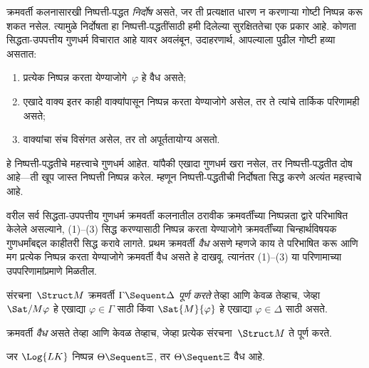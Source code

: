 \begin{explain}
क्रमवर्ती कलनासारखी निष्पत्ती-पद्धत \emph{निर्दोष} असते, जर ती
प्रत्यक्षात धारण न करणाऱ्या गोष्टी निष्पन्न करू शकत नसेल. त्यामुळे
निर्दोषता हा निष्पत्ती-पद्धतींसाठी हमी दिलेल्या सुरक्षिततेचा एक प्रकार
आहे. कोणता सिद्धता-उपपत्तीय गुणधर्म विचारात आहे यावर अवलंबून, उदाहरणार्थ,
आपल्याला पुढील गोष्टी हव्या असतात:
\begin{enumerate}
\item प्रत्येक निष्पन्न करता येण्याजोगे~$\varphi$ हे वैध असते;
\item एखादे वाक्य इतर काही वाक्यांपासून निष्पन्न करता येण्याजोगे असेल, तर ते
  त्यांचे तार्किक परिणामही असते;
\item वाक्यांचा संच विसंगत असेल, तर तो अपूर्ततायोग्य असतो.
\end{enumerate}
हे निष्पत्ती-पद्धतीचे महत्त्वाचे गुणधर्म आहेत. यांपैकी एखादा गुणधर्म
खरा नसेल, तर निष्पत्ती-पद्धतीत दोष आहे—ती खूप जास्त निष्पत्ती
निष्पन्न करेल. म्हणून निष्पत्ती-पद्धतीची निर्दोषता सिद्ध करणे अत्यंत
महत्त्वाचे आहे.

वरील सर्व सिद्धता-उपपत्तीय गुणधर्म क्रमवर्ती कलनातील ठरावीक क्रमवर्तींच्या
निष्पन्नता द्वारे परिभाषित केलेले असल्याने, (1)--(3) सिद्ध करण्यासाठी
निष्पन्न करता येण्याजोगे क्रमवर्तींच्या चिन्हार्थविषयक गुणधर्मांबद्दल काहीतरी सिद्ध करावे
लागते. प्रथम क्रमवर्ती \emph{वैध} असणे म्हणजे काय ते परिभाषित करू आणि मग
प्रत्येक निष्पन्न करता येण्याजोगे क्रमवर्ती वैध असते हे दाखवू. त्यानंतर (1)--(3) या
परिणामाच्या उपपरिणामांप्रमाणे मिळतील.
\end{explain}

\begin{defn}
संरचना~$\Struct
  M$ क्रमवर्ती
$\Gamma \Sequent \Delta$ \emph{पूर्ण करते} तेव्हा आणि केवळ तेव्हाच, जेव्हा
$\Sat/{M}{\varphi}$ हे एखाद्या $\varphi \in \Gamma$ साठी किंवा
$\Sat{M}{\varphi}$ हे एखाद्या $\varphi \in \Delta$ साठी असते.

क्रमवर्ती \emph{वैध} असते तेव्हा आणि केवळ तेव्हाच, जेव्हा प्रत्येक
संरचना~$\Struct
  M$ ते पूर्ण करते.
\end{defn}

\begin{thm}[निर्दोषता]
\label{fol:seq:sou:thm:sequent-soundness} जर $\Log{LK}$ निष्पन्न $\Theta
\Sequent \Xi$, तर $\Theta \Sequent \Xi$ वैध आहे.
\end{thm}


